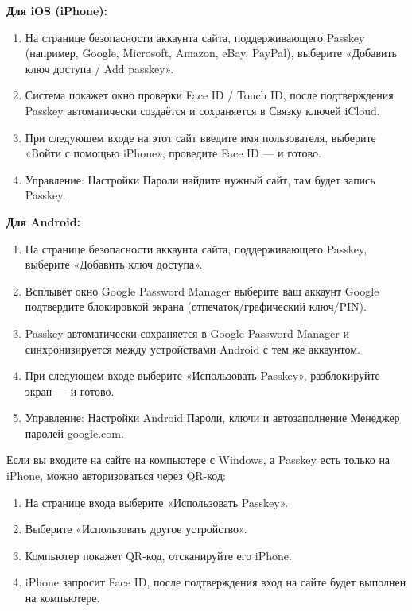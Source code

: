 
\textbf{Для iOS (iPhone):}

\begin{enumerate}
  \item На странице безопасности аккаунта сайта, поддерживающего Passkey (например, Google, Microsoft, Amazon, eBay, PayPal), выберите «Добавить ключ доступа / Add passkey».
  \item Система покажет окно проверки Face ID / Touch ID, после подтверждения Passkey автоматически создаётся и сохраняется в Связку ключей iCloud.
  \item При следующем входе на этот сайт введите имя пользователя, выберите «Войти с помощью iPhone», проведите Face ID — и готово.
  \item Управление: Настройки Пароли найдите нужный сайт, там будет запись Passkey.
\end{enumerate}

\textbf{Для Android:}

\begin{enumerate}
  \item На странице безопасности аккаунта сайта, поддерживающего Passkey, выберите «Добавить ключ доступа».
  \item Всплывёт окно Google Password Manager выберите ваш аккаунт Google подтвердите блокировкой экрана (отпечаток/графический ключ/PIN).
  \item Passkey автоматически сохраняется в Google Password Manager и синхронизируется между устройствами Android с тем же аккаунтом.
  \item При следующем входе выберите «Использовать Passkey», разблокируйте экран — и готово.
  \item Управление: Настройки Android Пароли, ключи и автозаполнение Менеджер паролей google.com.
\end{enumerate}


Если вы входите на сайте на компьютере с Windows, а Passkey есть только на iPhone, можно авторизоваться через QR-код:

\begin{enumerate}
  \item На странице входа выберите «Использовать Passkey».
  \item Выберите «Использовать другое устройство».
  \item Компьютер покажет QR-код, отсканируйте его iPhone.
  \item iPhone запросит Face ID, после подтверждения вход на сайте будет выполнен на компьютере.
\end{enumerate}


